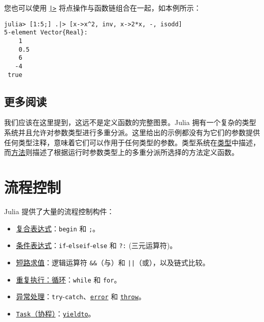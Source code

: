 您也可以使用 \hyperlink{5135459825603202944}{\texttt{|>}} 将点操作与函数链组合在一起，如本例所示：




\begin{verbatim}
julia> [1:5;] .|> [x->x^2, inv, x->2*x, -, isodd]
5-element Vector{Real}:
    1
    0.5
    6
   -4
 true
\end{verbatim}



\hypertarget{17965614568943116111}{}


\section{更多阅读}



我们应该在这里提到，这远不是定义函数的完整图景。Julia 拥有一个复杂的类型系统并且允许对参数类型进行多重分派。这里给出的示例都没有为它们的参数提供任何类型注释，意味着它们可以作用于任何类型的参数。类型系统在\hyperlink{8510890508040013186}{类型}中描述，而\hyperlink{3842379394166369470}{方法}则描述了根据运行时参数类型上的多重分派所选择的方法定义函数。



\hypertarget{8001618391799989953}{}


\chapter{流程控制}



Julia 提供了大量的流程控制构件：



\begin{itemize}
\item \hyperlink{14178955634857450370}{复合表达式}：\texttt{begin} 和 \texttt{;}。


\item \hyperlink{14451148373001501733}{条件表达式}：\texttt{if}-\texttt{elseif}-\texttt{else} 和 \texttt{?:} (三元运算符)。


\item \hyperlink{7551496361738057869}{短路求值}：逻辑运算符 \texttt{\&\&}（与）和 \texttt{||}（或），以及链式比较。


\item \hyperlink{9034109510149997190}{重复执行：循环}：\texttt{while} 和 \texttt{for}。


\item \hyperlink{17887694433469406627}{异常处理}：\texttt{try}-\texttt{catch}、\hyperlink{17992125292605951734}{\texttt{error}} 和 \hyperlink{16410366672587017456}{\texttt{throw}}。


\item \hyperlink{17473131347184639576}{\texttt{Task}（协程）}：\hyperlink{4920987536368477483}{\texttt{yieldto}}。

\end{itemize}


